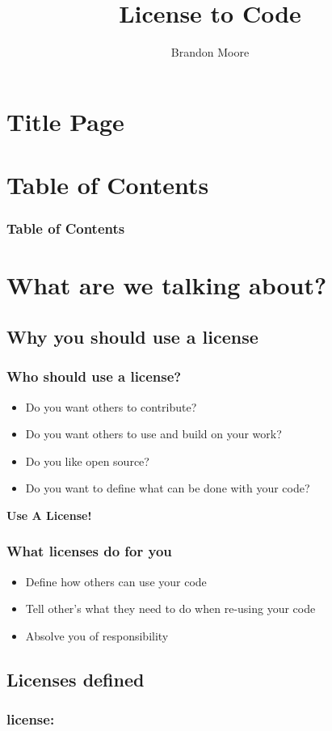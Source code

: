 \documentclass{beamer}
\begin{document}
	\title{License to Code}
	\author{Brandon Moore}
	\date{}
	\section{Title Page}
	\frame{\titlepage}
	\section{Table of Contents}
	\begin{frame}
		\frametitle{Table of Contents}
		\tableofcontents[]
	\end{frame}
	\section{What are we talking about?}
	\subsection{Why you should use a license}
	\begin{frame}
		\frametitle{Who should use a license?}
		\pause
		\begin{itemize}[<+->]
			\item Do you want others to contribute?
			\item Do you want others to use and build on your work?
			\item Do you like open source?
			\item Do you want to define what can be done with your code?
		\end{itemize}
		\pause
		\center\LARGE\textbf{Use A License!}
	\end{frame}
	\begin{frame}
		\frametitle{What licenses do for you}
		\pause
		\begin{itemize}[<+->]
			\item Define how others can use your code
			\item Tell other's what they need to do when re-using your code
			\item Absolve you of responsibility
		\end{itemize}
	\end{frame}
	\subsection{Licenses defined}
	\begin{frame}
		\frametitle{license:}
		
	\end{frame}
\end{document}
